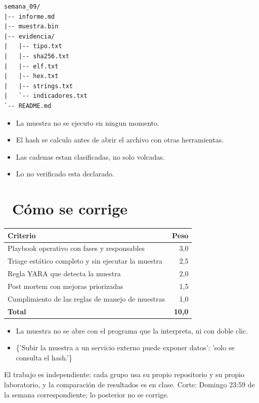 \documentclass[11pt,a4paper]{article}
\newcommand{\iconotexto}[2]{\textcolor{cyanNeon}{\faIcon{#1}}~#2}
\begin{document}
\begin{lstlisting}[style=estiloCodigo]
semana_09/
|-- informe.md
|-- muestra.bin
|-- evidencia/
|   |-- tipo.txt
|   |-- sha256.txt
|   |-- elf.txt
|   |-- hex.txt
|   |-- strings.txt
|   `-- indicadores.txt
`-- README.md
\end{lstlisting}

\begin{itemize}[leftmargin=1.4em,itemsep=2pt,topsep=3pt]
  \item La muestra no se ejecuto en ningun momento.
  \item El hash se calculo antes de abrir el archivo con otras herramientas.
  \item Las cadenas estan clasificadas, no solo volcadas.
  \item Lo no verificado esta declarado.
\end{itemize}

\section{\iconotexto{ruler-combined}{Cómo se corrige}}

\begin{tabularx}{\linewidth}{@{}X r@{}}
\toprule
Criterio & Peso\\
\midrule
Playbook operativo con fases y responsables & 3,0 \\
Triage estático completo y sin ejecutar la muestra & 2,5 \\
Regla YARA que detecta la muestra & 2,0 \\
Post mortem con mejoras priorizadas & 1,5 \\
Cumplimiento de las reglas de manejo de muestras & 1,0 \\
\midrule
\textbf{Total} & \textbf{10,0}\\
\bottomrule
\end{tabularx}

\begin{itemize}[leftmargin=1.4em,itemsep=2pt,topsep=3pt]
  \item La muestra no se abre con el programa que la interpreta, ni con doble clic.
  \item \{'Subir la muestra a un servicio externo puede exponer datos': 'solo se consulta el hash.'\}
\end{itemize}

\begin{cajaRecuerda}El trabajo es independiente: cada grupo usa su propio repositorio y su propio laboratorio, y la comparación de resultados es en clase. Corte: Domingo 23:59 de la semana correspondiente; lo posterior no se corrige.
\end{cajaRecuerda}
\end{document}
